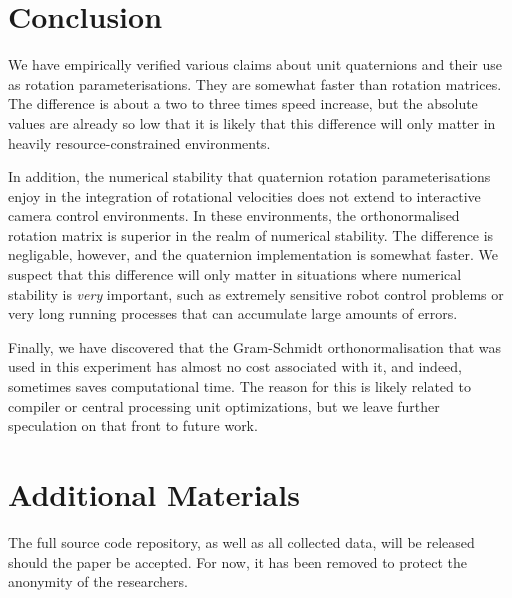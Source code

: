 \documentclass{acm_proc_article-sp}
\begin{document}
\section{Conclusion}

We have empirically verified various claims about unit quaternions and their use as rotation parameterisations.
They are somewhat faster than rotation matrices.
The difference is about a two to three times speed increase, but the absolute values are already so low that it is likely that this difference will only matter in heavily resource-constrained environments.

In addition, the numerical stability that quaternion rotation parameterisations enjoy in the integration of rotational velocities does not extend to interactive camera control environments.
In these environments, the orthonormalised rotation matrix is superior in the realm of numerical stability.
The difference is negligable, however, and the quaternion implementation is somewhat faster.
We suspect that this difference will only matter in situations where numerical stability is \emph{very} important, such as extremely sensitive robot control problems or very long running processes that can accumulate large amounts of errors.

Finally, we have discovered that the Gram-Schmidt orthonormalisation that was used in this experiment has almost no cost associated with it, and indeed, sometimes saves computational time.
The reason for this is likely related to compiler or central processing unit optimizations, but we leave further speculation on that front to future work.

\section{Additional Materials}

The full source code repository, as well as all collected data, will be released should the paper be accepted.
For now, it has been removed to protect the anonymity of the researchers.



\end{document}
